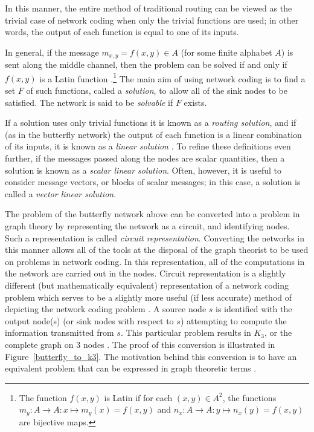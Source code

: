 In this manner, the entire method of traditional routing can be viewed as the trivial case of network coding when only the trivial functions are used; in other words, the output of each function is equal to one of its inputs.

\newpage

In general, if the message $m_{x, y} = f(x, y) \in A$ (for some finite alphabet $A$) is sent along the middle channel, then the problem can be solved if and only if $f(x, y)$ is a Latin function \cite{riah2004}.\footnote{The function $f(x, y)$ is Latin if for each $(x, y) \in A^2$, the functions $m_y : A \rightarrow A : x \mapsto m_y(x) = f(x, y)$ and $n_x : A \rightarrow A : y \mapsto n_x(y) = f(x, y)$ are bijective maps.} The main aim of using network coding is to find a set $F$ of such functions, called a \emph{solution}, to allow all of the sink nodes to be satisfied. The network is said to be \emph{solvable} if $F$ exists.

If a solution uses only trivial functions it is known as a \emph{routing solution}, and if (as in the butterfly network) the output of each function is a linear combination of its inputs, it is known as a \emph{linear solution} \cite{cann2006}. To refine these definitions even further, if the messages passed along the nodes are scalar quantities, then a solution is known as a \emph{scalar linear solution}. Often, however, it is useful to consider message vectors, or blocks of scalar messages; in this case, a solution is called a \emph{vector linear solution}.

The problem of the butterfly network above can be converted into a problem in graph theory by representing the network as a circuit, and identifying nodes. Such a representation is called \emph{circuit representation}. Converting the networks in this manner allows all of the tools at the disposal of the graph theorist to be used on problems in network coding. In this representation, all of the computations in the network are carried out in the nodes. Circuit representation is a slightly different (but mathematically equivalent) representation of a network coding problem which serves to be a slightly more useful (if less accurate) method of depicting the network coding problem \cite{riis2005util}. A source node $s$ is identified with the output node(s) (or sink nodes with respect to $s$) attempting to compute the information transmitted from $s$. This particular problem results in $K_3$, or the complete graph on $3$ nodes \cite{riis2005util}. The proof of this conversion is illustrated in Figure~\ref{butterfly_to_k3}. The motivation behind this conversion is to have an equivalent problem that can be expressed in graph theoretic terms \cite{riis2005util, riis2005info}.

